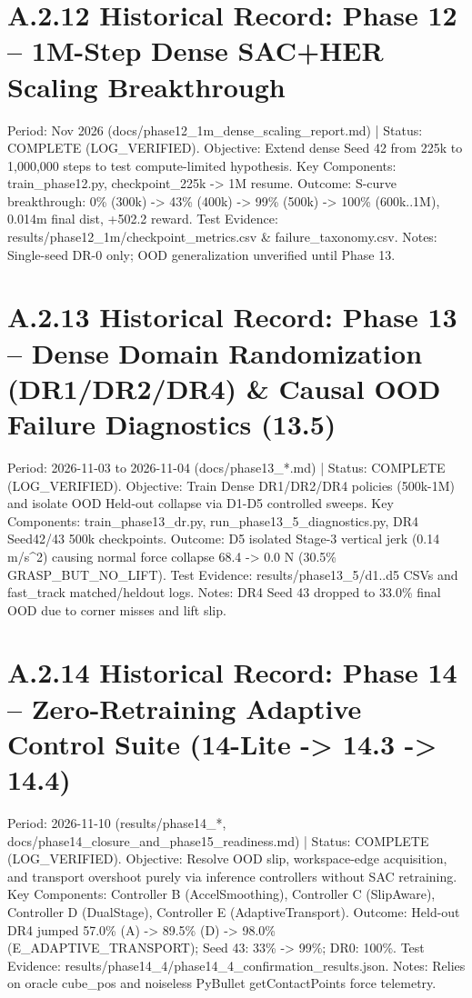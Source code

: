 \documentclass[11pt,a4paper,oneside]{book}
\begin{document}
\section{A.2.12 Historical Record: Phase 12 -- 1M-Step Dense SAC+HER Scaling Breakthrough}
Period: Nov 2026 (docs/phase12\_1m\_dense\_scaling\_report.md) | Status: COMPLETE (LOG\_VERIFIED). Objective: Extend dense Seed 42 from 225k to 1,000,000 steps to test compute-limited hypothesis. Key Components: train\_phase12.py, checkpoint\_225k -> 1M resume. Outcome: S-curve breakthrough: 0\% (300k) -> 43\% (400k) -> 99\% (500k) -> 100\% (600k..1M), 0.014m final dist, +502.2 reward. Test Evidence: results/phase12\_1m/checkpoint\_metrics.csv \& failure\_taxonomy.csv. Notes: Single-seed DR-0 only; OOD generalization unverified until Phase 13.

\section{A.2.13 Historical Record: Phase 13 -- Dense Domain Randomization (DR1/DR2/DR4) \& Causal OOD Failure Diagnostics (13.5)}
Period: 2026-11-03 to 2026-11-04 (docs/phase13\_*.md) | Status: COMPLETE (LOG\_VERIFIED). Objective: Train Dense DR1/DR2/DR4 policies (500k-1M) and isolate OOD Held-out collapse via D1-D5 controlled sweeps. Key Components: train\_phase13\_dr.py, run\_phase13\_5\_diagnostics.py, DR4 Seed42/43 500k checkpoints. Outcome: D5 isolated Stage-3 vertical jerk (0.14 m/s^2) causing normal force collapse 68.4 -> 0.0 N (30.5\% GRASP\_BUT\_NO\_LIFT). Test Evidence: results/phase13\_5/d1..d5 CSVs and fast\_track matched/heldout logs. Notes: DR4 Seed 43 dropped to 33.0\% final OOD due to corner misses and lift slip.

\section{A.2.14 Historical Record: Phase 14 -- Zero-Retraining Adaptive Control Suite (14-Lite -> 14.3 -> 14.4)}
Period: 2026-11-10 (results/phase14\_*, docs/phase14\_closure\_and\_phase15\_readiness.md) | Status: COMPLETE (LOG\_VERIFIED). Objective: Resolve OOD slip, workspace-edge acquisition, and transport overshoot purely via inference controllers without SAC retraining. Key Components: Controller B (AccelSmoothing), Controller C (SlipAware), Controller D (DualStage), Controller E (AdaptiveTransport). Outcome: Held-out DR4 jumped 57.0\% (A) -> 89.5\% (D) -> 98.0\% (E\_ADAPTIVE\_TRANSPORT); Seed 43: 33\% -> 99\%; DR0: 100\%. Test Evidence: results/phase14\_4/phase14\_4\_confirmation\_results.json. Notes: Relies on oracle cube\_pos and noiseless PyBullet getContactPoints force telemetry.
\end{document}
